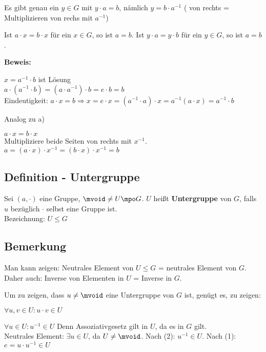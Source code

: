 		\item Es gibt genau ein $y\in G$ mit $y\cdot a=b$, nämlich $y=b\cdot a^{-1}$ ( von rechts = Multiplizieren von rechs mit $a^{-1}$)

		\item Ist $a\cdot x=b\cdot x$ für ein $x\in G$, so ist $a=b$. Ist $y\cdot a=y\cdot b$ für ein $y\in G$, so ist $a=b$.
	\subExEnd

	\textbf{Beweis:}
		\item $x=a^{-1}\cdot b$ ist Lösung\\
		$a\cdot(a^{-1}\cdot b)=(a\cdot a^{-1})\cdot b=e\cdot b=b$\\
		Eindeutigkeit: $a\cdot x=b\Rightarrow x=e\cdot x=(a^{-1}\cdot a)\cdot x=a^{-1}(a\cdot x)=a^{-1}\cdot b$

		\item Analog zu a)
		\item $a\cdot x=b\cdot x$\\
		Multipliziere beide Seiten von rechts mit $x^{-1}$. $a=(a\cdot x)\cdot x^{-1}=(b\cdot x)\cdot x^{-1}=b$
	\subExEnd

	\subsection{Definition - Untergruppe}

	Sei $(a,\cdot)$ eine Gruppe, $\mvoid\neq U\mpo G$. $U$ heißt \textbf{Untergruppe} von $G$, falls $u$ bezüglich $\cdot$ selbst eine Gruppe ist.\\
	Bezeichnung: $U\leq G$

	\subsection{Bemerkung}

		\item Man kann zeigen: Neutrales Element von $U\leq G$ = neutrales Element von $G$. Daher auch: Inverse von Elementen in $U$ = Inverse in $G$.
		\item Um zu zeigen, dass $u\neq\mvoid$ eine Untergruppe von $G$ ist, genügt es, zu zeigen:
			\item $\forall u,v\in U:u\cdot v\in U$
			\item $\forall u\in U: u^{-1}\in U$
		\subExEnd
		Denn Assoziativgesetz gilt in $U$, da es in $G$ gilt.\\
		Neutrales Element: $\exists u\in U$, da $U\neq\mvoid$. Nach (2): $u^{-1}\in U$. Nach (1): $e=u\cdot u^{-1}\in U$
	\subExEnd

